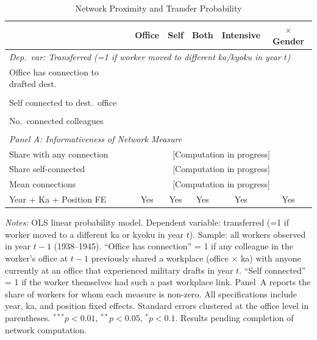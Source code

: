 \begin{table}[htbp]
\centering
\caption{Network Proximity and Transfer Probability}
\label{tab:network}
\begin{threeparttable}

\begin{tabular}{lccccc}
\toprule
 & Office & Self & Both & Intensive & $\times$ Gender \\
\midrule
\multicolumn{6}{l}{\textit{Dep.\ var: Transferred (=1 if worker moved to different ka/kyoku in year $t$)}} \\
Office has connection to drafted dest. & & & & & \\
 & & & & & \\
Self connected to dest.\ office & & & & & \\
 & & & & & \\
No.\ connected colleagues & & & & & \\
 & & & & & \\
\midrule
\multicolumn{6}{l}{\textit{Panel A: Informativeness of Network Measure}} \\
\midrule
Share with any connection & \multicolumn{5}{c}{[Computation in progress]} \\
Share self-connected & \multicolumn{5}{c}{[Computation in progress]} \\
Mean connections & \multicolumn{5}{c}{[Computation in progress]} \\
\midrule
Year + Ka + Position FE & Yes & Yes & Yes & Yes & Yes \\
\bottomrule
\end{tabular}

\begin{tablenotes}[flushleft]
\footnotesize
\item \textit{Notes:} OLS linear probability model. Dependent variable: transferred (=1 if worker moved to a different ka or kyoku in year $t$). Sample: all workers observed in year $t{-}1$ (1938--1945). ``Office has connection'' = 1 if any colleague in the worker's office at $t{-}1$ previously shared a workplace (office $\times$ ka) with anyone currently at an office that experienced military drafts in year $t$. ``Self connected'' = 1 if the worker themselves had such a past workplace link. Panel~A reports the share of workers for whom each measure is non-zero. All specifications include year, ka, and position fixed effects. Standard errors clustered at the office level in parentheses. $^{***}p<0.01$, $^{**}p<0.05$, $^{*}p<0.1$. Results pending completion of network computation.
\end{tablenotes}
\end{threeparttable}
\end{table}
